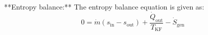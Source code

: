 **Entropy balance:**  
The entropy balance equation is given as:  
\[
0 = \dot{m} \left( s_{\text{in}} - s_{\text{out}} \right) + \frac{\dot{Q}_{\text{out}}}{T_{\text{KF}}} - \dot{S}_{\text{gen}}
\]